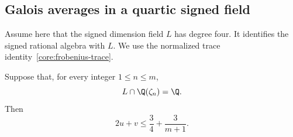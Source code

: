 \subsection{Galois averages in a quartic signed field}
Assume here that the signed dimension field $L$ has degree four.
It identifies the signed rational algebra with $L$. We use the
normalized trace identity~\eqref{core:frobenius-trace}.
\begin{proposition}\label{core:prop:quartic-individual-disjointness}
Suppose that, for every integer $1\le n\le m$,
\begin{equation}\label{core:eq:quartic-individual-intersection}
 L\cap\Q(\zeta_n)=\Q.
\end{equation}
Then
\begin{equation}\label{core:eq:quartic-averaged-bound}
 2u+v\le\frac34+\frac3{m+1}.
\end{equation}
\end{proposition}

